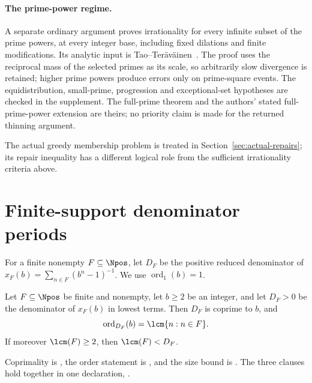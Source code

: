 \documentclass[11pt]{article}
\begin{document}
\paragraph{The prime-power regime.}
A separate ordinary argument proves irrationality for every infinite
subset of the prime powers, at every integer base, including fixed
dilations and finite modifications.  Its analytic input is
Tao--Ter\"av\"ainen~\cite[Theorem~3.1]{taoteravainen2025}.
The proof uses the reciprocal mass of the selected primes as its scale,
so arbitrarily slow divergence is retained; higher prime powers produce
errors only on prime-square events.  The equidistribution, small-prime,
progression and exceptional-set hypotheses are checked in the supplement.
The full-prime theorem and the authors' stated full-prime-power extension
are theirs; no priority claim is made for the returned thinning argument.

The actual greedy membership problem is treated in
Section~\ref{sec:actual-repairs}; its repair inequality has a different
logical role from the sufficient irrationality criteria above.

\section{Finite-support denominator periods}\label{sec:period}

For a finite nonempty $F\subseteq\Npos$, let $D_F$ be the positive reduced
denominator of $x_F(b)=\sum_{n\in F}(b^n-1)^{-1}$.
We use $\operatorname{ord}_1(b)=1$.

\begin{theorem}\label{res:period}
Let $F\subseteq\Npos$ be finite and nonempty, let $b\ge2$ be an integer, and
let $D_F>0$ be the denominator of $x_F(b)$ in lowest terms.  Then $D_F$ is
coprime to $b$, and
\[
  \operatorname{ord}_{D_F}(b)=\lcm\{n:n\in F\}.
\]
If moreover $\lcm(F)\ge2$, then $\lcm(F)<D_F$.
\end{theorem}

Coprimality is
, the order statement is
, and the size bound is
.
The three clauses hold together in one declaration,
\href{https://github.com/wcook04/plectis-erdos/blob/f36a98bf3d3e6f65f1074e3b800e3293d5b8a51a/ErdosProblems/Erdos257/PaperCompleteR7/Assemblies.lean#L29}{}.
\end{document}
